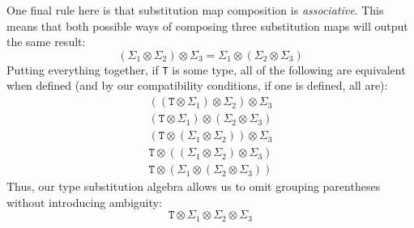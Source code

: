 \documentclass[../generics]{subfiles}
\begin{document}
One final rule here is that substitution map composition is \emph{associative}. This means that both possible ways of composing three substitution maps will output the same result:
\[
(\Sigma_1\otimes\Sigma_2)\otimes\Sigma_3=\Sigma_1\otimes(\Sigma_2\otimes\Sigma_3)
\]
Putting everything together, if \texttt{T} is some type, all of the following are equivalent when defined (and by our compatibility conditions, if one is defined, all are):
\begin{gather*}
((\texttt{T}\otimes\Sigma_1)\otimes\Sigma_2)\otimes\Sigma_3\\
(\texttt{T}\otimes\Sigma_1)\otimes(\Sigma_2\otimes\Sigma_3)\\
(\texttt{T}\otimes(\Sigma_1\otimes\Sigma_2))\otimes\Sigma_3\\
\texttt{T}\otimes((\Sigma_1\otimes\Sigma_2)\otimes\Sigma_3)\\
\texttt{T}\otimes(\Sigma_1\otimes(\Sigma_2\otimes\Sigma_3))
\end{gather*}
Thus, our type substitution algebra allows us to omit grouping parentheses without introducing ambiguity:
\[\texttt{T}\otimes\Sigma_1\otimes\Sigma_2\otimes\Sigma_3\]
\end{document}
